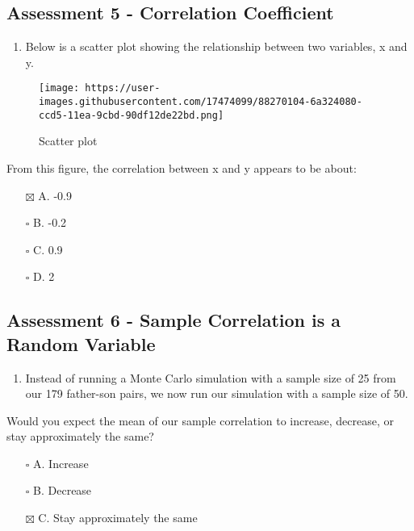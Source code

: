 \documentclass[
]{article}
\providecommand{\tightlist}{%
  \setlength{\itemsep}{0pt}\setlength{\parskip}{0pt}}
\begin{document}
\hypertarget{assessment-5---correlation-coefficient}{%
\subsection{Assessment 5 - Correlation
Coefficient}\label{assessment-5---correlation-coefficient}}

\begin{enumerate}
\def\labelenumi{\arabic{enumi}.}
\tightlist
\item
  Below is a scatter plot showing the relationship between two
  variables, x and y.
\end{enumerate}

\begin{figure}
\centering
\texttt{[image: https://user-images.githubusercontent.com/17474099/88270104-6a324080-ccd5-11ea-9cbd-90df12de22bd.png]}
\caption{Scatter plot}
\end{figure}

From this figure, the correlation between x and y appears to be about:

\begin{itemize}
\tightlist
\item[$\boxtimes$]
  A. -0.9
\item[$\square$]
  B. -0.2
\item[$\square$]
  C. 0.9
\item[$\square$]
  D. 2
\end{itemize}

\hypertarget{assessment-6---sample-correlation-is-a-random-variable}{%
\subsection{Assessment 6 - Sample Correlation is a Random
Variable}\label{assessment-6---sample-correlation-is-a-random-variable}}

\begin{enumerate}
\def\labelenumi{\arabic{enumi}.}
\tightlist
\item
  Instead of running a Monte Carlo simulation with a sample size of 25
  from our 179 father-son pairs, we now run our simulation with a sample
  size of 50.
\end{enumerate}

Would you expect the mean of our sample correlation to increase,
decrease, or stay approximately the same?

\begin{itemize}
\tightlist
\item[$\square$]
  A. Increase
\item[$\square$]
  B. Decrease
\item[$\boxtimes$]
  C. Stay approximately the same
\end{itemize}
\end{document}
